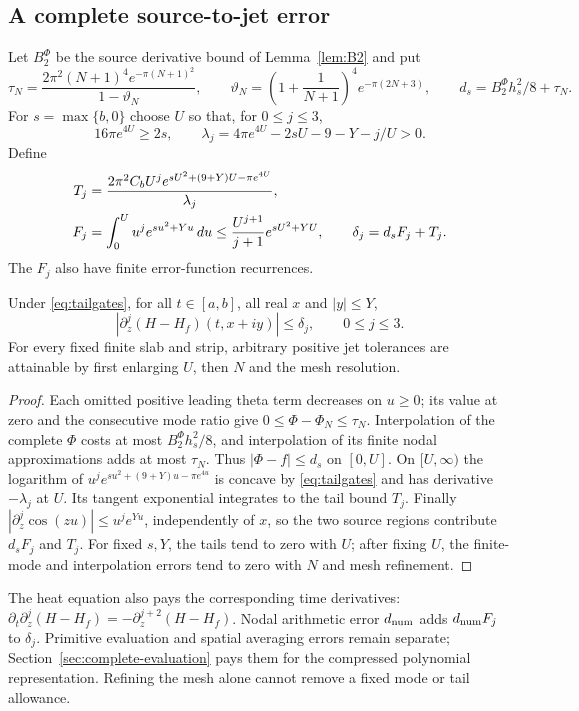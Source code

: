 \subsection{A complete source-to-jet error}
Let $B_2^{\Phi}$ be the source derivative bound of Lemma~\ref{lem:B2} and put
\begin{equation}
 \tau_N=\frac{2\pi^2(N+1)^4e^{-\pi(N+1)^2}}{1-\vartheta_N},\qquad
 \vartheta_N=\left(1+\frac1{N+1}\right)^4e^{-\pi(2N+3)},\qquad
 d_s=B_2^{\Phi}h_s^2/8+\tau_N.
 \label{eq:sourceinterpolation}
\end{equation}
For $s=\max\{b,0\}$ choose $U$ so that, for $0\le j\le3$,
\begin{equation}
 16\pi e^{4U}\ge2s,\qquad
 \lambda_j=4\pi e^{4U}-2sU-9-Y-j/U>0.
 \label{eq:tailgates}
\end{equation}
Define
\begin{align}
 T_j&=\frac{2\pi^2C_bU^j
               e^{sU^2+(9+Y)U-\pi e^{4U}}}{\lambda_j},\notag\\
 F_j&=\int_0^U u^je^{su^2+Yu}\,du
       \le\frac{U^{j+1}}{j+1}e^{sU^2+YU},\qquad
 \delta_j=d_sF_j+T_j.\label{eq:jetallowances}
\end{align}
The $F_j$ also have finite error-function recurrences.

\begin{theorem}\label{thm:finitejets}
Under \eqref{eq:tailgates}, for all $t\in[a,b]$, all real $x$ and
$|y|\le Y$,
\begin{equation}
 |\partial_z^j(H-H_f)(t,x+iy)|\le\delta_j,\qquad 0\le j\le3.
 \label{eq:finitejets}
\end{equation}
For every fixed finite slab and strip, arbitrary positive jet tolerances
are attainable by first enlarging $U$, then $N$ and the mesh resolution.
\end{theorem}
\begin{proof}
Each omitted positive leading theta term decreases on $u\ge0$;
its value at zero and the consecutive mode ratio give
$0\le\Phi-\Phi_N\le\tau_N$.
Interpolation of the complete $\Phi$ costs at most $B_2^{\Phi}h_s^2/8$,
and interpolation of its finite nodal approximations adds at most
$\tau_N$. Thus $|\Phi-f|\le d_s$ on $[0,U]$.
On $[U,\infty)$ the logarithm of
$u^je^{su^2+(9+Y)u-\pi e^{4u}}$ is concave by
\eqref{eq:tailgates} and has derivative $-\lambda_j$ at $U$.
Its tangent exponential integrates to the tail bound $T_j$.
Finally $|\partial_z^j\cos(zu)|\le u^je^{Y u}$, independently of $x$,
so the two source regions contribute $d_sF_j$ and $T_j$.
For fixed $s,Y$, the tails tend to zero with $U$; after fixing $U$,
the finite-mode and interpolation errors tend to zero with $N$ and
mesh refinement.
\end{proof}
The heat equation also pays the corresponding time derivatives:
$\partial_t\partial_z^j(H-H_f)=-\partial_z^{j+2}(H-H_f)$.
Nodal arithmetic error $d_{\rm num}$ adds $d_{\rm num}F_j$ to
$\delta_j$. Primitive evaluation and spatial averaging errors remain
separate; Section~\ref{sec:complete-evaluation} pays them for the
compressed polynomial representation. Refining the mesh alone cannot remove a fixed mode or tail
allowance.

